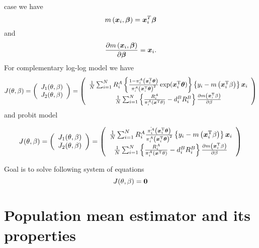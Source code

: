\documentclass[
  letterpaper,
  DIV=11,
  numbers=noendperiod]{scrreprt}
\begin{document}
case we have \[
m\left(\boldsymbol{x}_i, \boldsymbol{\beta}\right) = \boldsymbol{x}_i^{T} \boldsymbol{\beta}
\] and \[
\frac{\partial m\left(\boldsymbol{x}_i, \boldsymbol{\beta}\right)}{\partial \boldsymbol{\beta}} = \boldsymbol{x}_i.
\] For complementary log-log model we have \[
\begin{equation}
J(\theta, \beta)=\left(\begin{array}{c}
J_1(\theta, \beta) \\
J_2(\theta, \beta)
\end{array}\right)=\left(\begin{array}{c}
\frac{1}{N} \sum_{i=1}^N R_i^A\left\{\frac{1 - \pi_i^A\left(\bx_i^{\mathrm{T}} \btheta \right)}{\pi_i^A\left(\bx_i^{\mathrm{T}} \btheta \right)^2} \exp(\bx_i^{\mathrm{T}} \btheta)\right\}\left\{y_i-m\left(\bx_i^{\mathrm{T}} \beta\right)\right\} \bx_i \\
\frac{1}{N} \sum_{i=1}^N\left\{\frac{R_i^A}{\pi_i^A\left(\bx^{\mathrm{T}}\theta\right)}-d_i^B R_i^B\right\} \frac{\partial m\left(\bx_i^{\mathrm{T}} \beta\right)}{\partial \beta}
\end{array}\right)
\end{equation}
\] and probit model

\[
\begin{equation}
J(\theta, \beta)=\left(\begin{array}{c}
J_1(\theta, \beta) \\
J_2(\theta, \beta)
\end{array}\right)=\left(\begin{array}{c}
\frac{1}{N} \sum_{i=1}^N R_i^A\frac{\dot{\pi_i^A}\left(\bx_i^{\mathrm{T}} \btheta \right)}{\pi_i^A\left(\bx_i^{\mathrm{T}} \btheta \right)^2} \left\{y_i-m\left(\bx_i^{\mathrm{T}} \beta\right)\right\} \bx_i \\
\frac{1}{N} \sum_{i=1}^N\left\{\frac{R_i^A}{\pi_i^A\left(\bx^{\mathrm{T}}\theta\right)}-d_i^B R_i^B\right\} \frac{\partial m\left(\bx_i^{\mathrm{T}} \beta\right)}{\partial \beta}
\end{array}\right)
\end{equation}
\]

Goal is to solve following system of equations \[
J(\theta, \beta)=\boldsymbol{0}
\]

\hypertarget{population-mean-estimator-and-its-properties-1}{%
\section{Population mean estimator and its
properties}\label{population-mean-estimator-and-its-properties-1}}
\end{document}
